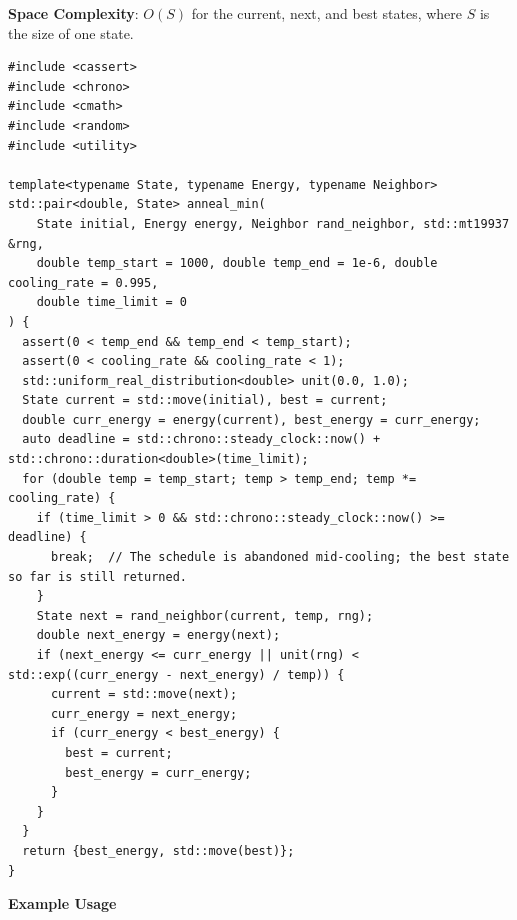 \textbf{Space Complexity}: $O(S)$ for the current, next, and best states, where $S$ is the size of one state.

\begin{lstlisting}[style=cpp]
#include <cassert>
#include <chrono>
#include <cmath>
#include <random>
#include <utility>

template<typename State, typename Energy, typename Neighbor>
std::pair<double, State> anneal_min(
    State initial, Energy energy, Neighbor rand_neighbor, std::mt19937 &rng,
    double temp_start = 1000, double temp_end = 1e-6, double cooling_rate = 0.995,
    double time_limit = 0
) {
  assert(0 < temp_end && temp_end < temp_start);
  assert(0 < cooling_rate && cooling_rate < 1);
  std::uniform_real_distribution<double> unit(0.0, 1.0);
  State current = std::move(initial), best = current;
  double curr_energy = energy(current), best_energy = curr_energy;
  auto deadline = std::chrono::steady_clock::now() + std::chrono::duration<double>(time_limit);
  for (double temp = temp_start; temp > temp_end; temp *= cooling_rate) {
    if (time_limit > 0 && std::chrono::steady_clock::now() >= deadline) {
      break;  // The schedule is abandoned mid-cooling; the best state so far is still returned.
    }
    State next = rand_neighbor(current, temp, rng);
    double next_energy = energy(next);
    if (next_energy <= curr_energy || unit(rng) < std::exp((curr_energy - next_energy) / temp)) {
      current = std::move(next);
      curr_energy = next_energy;
      if (curr_energy < best_energy) {
        best = current;
        best_energy = curr_energy;
      }
    }
  }
  return {best_energy, std::move(best)};
}
\end{lstlisting}
\textbf{Example Usage}\par
